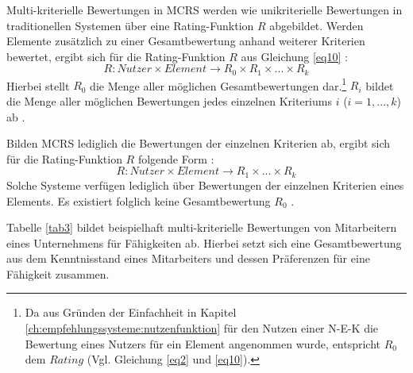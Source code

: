 
Multi-kriterielle Bewertungen in \ac{MCRS} werden wie unikriterielle Bewertungen in traditionellen Systemen über eine Rating-Funktion $R$ abgebildet.
Werden Elemente zusätzlich zu einer Gesamtbewertung anhand weiterer Kriterien bewertet, ergibt sich für die Rating-Funktion $R$ aus Gleichung \ref{eq10} \cite[S. 853]{adomavicius:4:inbook}:
\begin{equation}\label{eq11}
    R: Nutzer \times Element \rightarrow R_{0} \times R_{1} \times ... \times R_{k}
\end{equation}
Hierbei stellt $R_{0}$ die Menge aller möglichen Gesamtbewertungen dar.\footnote{Da aus Gründen der Einfachheit in Kapitel \ref{ch:empfehlungssysteme:nutzenfunktion} für den Nutzen einer \ac{N-E-K} die Bewertung eines Nutzers für ein Element angenommen wurde, entspricht $R_{0}$ dem $Rating$ (Vgl. Gleichung \ref{eq2} und \ref{eq10}).}
$R_{i}$ bildet die Menge aller möglichen Bewertungen jedes einzelnen Kriteriums $i$ ($i=1,...,k$) ab \cite[S. 49]{adomavicius:inproceedings:2}.

Bilden \ac{MCRS} lediglich die Bewertungen der einzelnen Kriterien ab, ergibt sich für die Rating-Funktion $R$ folgende Form \cite[S. 853]{adomavicius:4:inbook}:
\begin{equation}\label{eq12}
    R: Nutzer \times Element \rightarrow R_{1} \times ... \times R_{k}
\end{equation}
Solche Systeme verfügen lediglich über Bewertungen der einzelnen Kriterien eines Elements.
Es existiert folglich keine Gesamtbewertung $R_{0}$ \cite[S. 853]{adomavicius:4:inbook}.

Tabelle \ref{tab3} bildet beispielhaft multi-kriterielle Bewertungen von Mitarbeitern eines Unternehmens für Fähigkeiten ab.
Hierbei setzt sich eine Gesamtbewertung aus dem Kenntnisstand eines Mitarbeiters und dessen Präferenzen für eine Fähigkeit zusammen.

